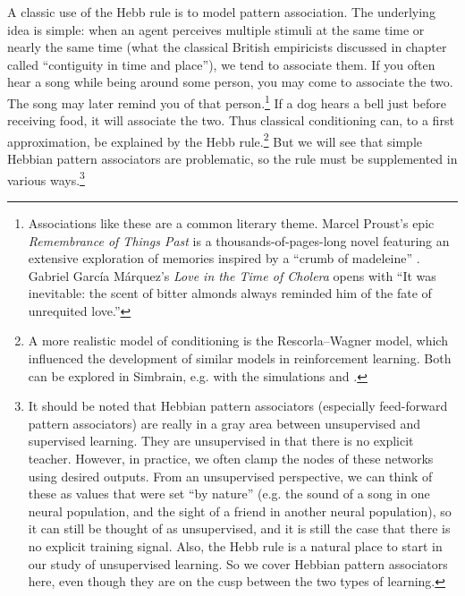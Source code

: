 A classic use of the Hebb rule is to model pattern association. The underlying idea is simple: when an agent perceives multiple stimuli at the same time or nearly the same time (what the classical British empiricists discussed in chapter  called ``contiguity in time and place''), we tend to associate them. If you often hear a song while being around some person, you may come to associate the two. The song may later remind you of that person.\footnote{Associations like these are a common literary theme. Marcel Proust's epic \emph{Remembrance of Things Past} is a thousands-of-pages-long novel featuring an extensive exploration of memories inspired by a ``crumb of madeleine'' \cite{proust2006remembrance}. Gabriel Garc\'{i}a M\'{a}rquez's \emph{Love in the Time of Cholera} opens with ``It was inevitable: the scent of bitter almonds always reminded him of the fate of unrequited love.''}  If a dog hears a bell just before receiving food, it will associate the two. Thus classical conditioning can, to a first approximation, be explained by the Hebb rule.\footnote{\label{hebb_updated}A more realistic model of conditioning is the Rescorla--Wagner model, which influenced the development of similar models in reinforcement learning. Both can be explored in Simbrain, e.g. with the simulations  and .}   But we will see that simple Hebbian pattern associators are problematic, so the rule must be supplemented in various ways.\footnote{\label{grayArea} It should be noted that Hebbian pattern associators (especially feed-forward pattern associators) are really in a gray area between unsupervised and supervised learning. They are unsupervised in that there is no explicit teacher. However, in practice, we often clamp the nodes of these networks using desired outputs. From an unsupervised perspective, we can think of these as values that were set ``by nature'' (e.g. the sound of a song in one neural population, and the sight of a friend in another neural population), so it can still be thought of as unsupervised, and it is still the case that there is no explicit training signal. Also, the Hebb rule is a natural place to start in our study of unsupervised learning. So we cover Hebbian pattern associators here, even though they are on the cusp between the two types of learning.}


